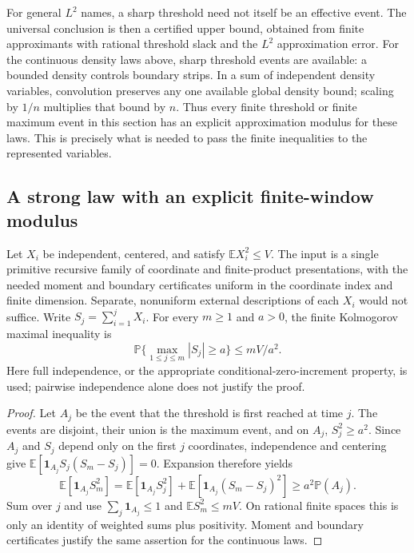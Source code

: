 For general $L^2$ names, a sharp threshold need not itself be an effective
event.  The universal conclusion is then a certified upper bound, obtained
from finite approximants with rational threshold slack and the $L^2$
approximation error.  For the continuous density laws above, sharp threshold
events are available: a bounded density controls boundary strips.  In a sum
of independent density variables, convolution preserves any one available
global density bound; scaling by $1/n$ multiplies that bound by $n$.
Thus every finite threshold or finite maximum event in this section has
an explicit approximation modulus for these laws.  This is precisely what
is needed to pass the finite inequalities to the represented variables.

\subsection{A strong law with an explicit finite-window modulus}

Let $X_i$ be independent, centered, and satisfy
$\mathbb E X_i^2\leq V$.  The input is a single primitive recursive family
of coordinate and finite-product presentations, with the needed moment and
boundary certificates uniform in the coordinate index and finite dimension.
Separate, nonuniform external descriptions of each $X_i$ would not suffice.
Write $S_j=\sum_{i=1}^jX_i$.
For every $m\geq1$ and $a>0$, the finite Kolmogorov maximal inequality is
\begin{equation}
 \mathbb P\{\max_{1\leq j\leq m}|S_j|\geq a\}
 \leq mV/a^2.
 \label{eq:kolmogorov}
\end{equation}
Here full independence, or the appropriate conditional-zero-increment
property, is used; pairwise independence alone does not justify the proof.

\begin{proof}
Let $A_j$ be the event that the threshold is first reached at time $j$.
The events are disjoint, their union is the maximum event, and on $A_j$,
$S_j^2\geq a^2$.  Since $A_j$ and $S_j$ depend only on the first $j$
coordinates, independence and centering give
$\mathbb E[\mathbf1_{A_j}S_j(S_m-S_j)]=0$.  Expansion therefore yields
\[
 \mathbb E[\mathbf1_{A_j}S_m^2]
 =\mathbb E[\mathbf1_{A_j}S_j^2]
  +\mathbb E[\mathbf1_{A_j}(S_m-S_j)^2]
 \geq a^2\mathbb P(A_j).
\]
Sum over $j$ and use $\sum_j\mathbf1_{A_j}\leq1$ and
$\mathbb E S_m^2\leq mV$.  On rational finite spaces this is only an
identity of weighted sums plus positivity.  Moment and boundary certificates
justify the same assertion for the continuous laws.
\end{proof}

